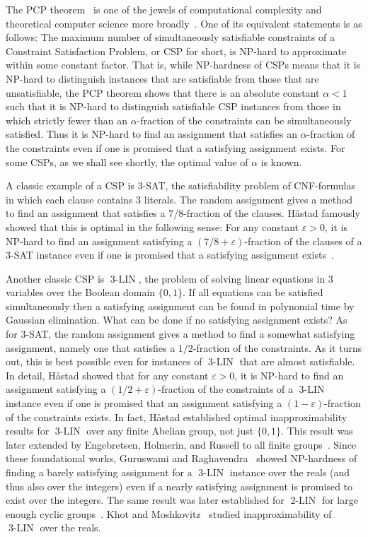 \documentclass[a4paper,11pt]{article}
\theoremstyle{definition}
\newcommand{\eq}{\ensuremath{\operatorname{3-LIN}}}
\newcommand{\eqqq}{\ensuremath{\operatorname{2-LIN}}}
\begin{document}
The PCP
theorem~\cite{Arora98:jacm-probabilistic,Arora98:jacm-proof,Dinur07:jacm} is one
of the jewels of computational complexity and theoretical computer science more
broadly~\cite{Arora2009computational}. One of its equivalent statements is as
follows: The maximum number of simultaneously satisfiable constraints of a
Constraint Satisfaction Problem, or CSP for short, is NP-hard to approximate within some
constant factor. That is, while NP-hardness of CSPs means that it is NP-hard to
distinguish instances that are satisfiable from those that are unsatisfiable,
the PCP theorem shows that there is an absolute constant $\alpha<1$ such that it
is NP-hard to distinguish satisfiable CSP instances from those in which strictly
fewer than an $\alpha$-fraction of the constraints can be simultaneously
satisfied. Thus it is NP-hard to find an assignment that satisfies an
$\alpha$-fraction of the constraints even if one is promised that a satisfying
assignment exists. For some CSPs, as we shall see shortly, the optimal value of
$\alpha$ is known.

A classic example of a CSP is 3-SAT, the satisfiability problem of
CNF-formulas in which each clause contains 3 literals. The random assignment gives
a method to find an assignment that satisfies a $7/8$-fraction of the clauses.
H{\aa}stad famously showed that this is optimal in the following sense: For any
constant $\varepsilon>0$, it is NP-hard to find an assignment satisfying a
$(7/8+\varepsilon)$-fraction of the clauses of a 3-SAT instance even if one
is promised that a satisfying assignment exists~\cite{Hastad01:jacm}.

Another classic CSP is $\eq$,
the problem of solving linear equations in 3
variables over the Boolean domain $\{0,1\}$. If all equations can be satisfied
simultaneously then a satisfying assignment can be found in polynomial time by
Gaussian elimination. What can be done if no satisfying assignment exists? As
for 3-SAT, the random assignment gives a method to find a somewhat satisfying
assignment, namely one that satisfies a $1/2$-fraction of the constraints. As it
turns out, this is best possible even for instances of $\eq$ that are almost
satisfiable. In detail, H{\aa}stad showed that for any constant $\varepsilon>0$,
it is NP-hard to find an assignment satisfying a $(1/2+\varepsilon)$-fraction of
the constraints of a $\eq$ instance even if one is promised that an
assignment satisfying a $(1-\varepsilon)$-fraction of the constraints exists.
In fact, H{\aa}stad established optimal inapproximability results for $\eq$ over any finite Abelian group, not
just $\{0,1\}$. This result was later extended by Engebretsen, Holmerin, and
Russell to all finite groups~\cite{EHR04:tcs}. Since these foundational works,
Guruswami and Raghavendra~\cite{Guruswami09:toct} showed NP-hardness of finding
a barely satisfying assignment for a $\eq$ instance over the reals (and thus
also over the integers) even if a nearly satisfying assignment is promised to
exist over the integers. The same result was later established for $\eqqq$ for
large enough cyclic groups~\cite{ODonnell15:toct}. Khot and
Moshkovitz~\cite{Khot13:sicomp} studied inapproximability of $\eq$ over the
reals.
\end{document}
